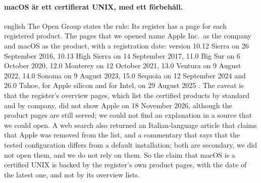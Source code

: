 \paragraph{%
  {macOS är ett certifierat UNIX, med ett förbehåll.}} %
\begin{onlyin}{english} %
The Open Group states the rule:
Its register has a page for each registered product.
The pages that we opened name Apple Inc.\ as the company and macOS as the
product, with a registration date: version 10.12 Sierra on 26 September
2016, 10.13 High Sierra on 14 September 2017, 11.0 Big Sur on 6 October
2020, 12.0 Monterey on 12 October 2021, 13.0 Ventura on 9 August 2022,
14.0 Sonoma on 9 August 2023, 15.0 Sequoia on 12 September 2024 and
26.0 Tahoe, for Apple silicon and for Intel, on 29 August 2025%
\autocite{OpenGroup2026Register}.
The caveat is that the register's overview pages, which list the
certified products by standard and by company, did not show Apple on 18
November 2026, although the product pages are still served; we could
not find an explanation in a source that we could open.
A web search also returned an Italian-language article that claims that
Apple was removed from the list, and a commentary that says that the
tested configuration differs from a default installation; both are
secondary, we did not open them, and we do not rely on them.
So the claim that macOS is a certified UNIX is backed by the register's
own product pages, with the date of the latest one, and not by its
overview lists.
\end{onlyin}
